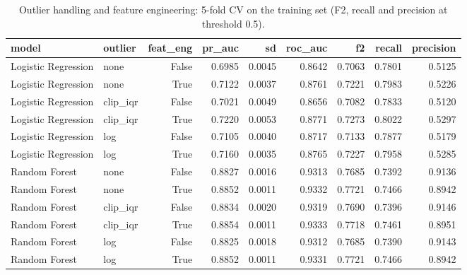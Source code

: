 \begin{table}[H]
\centering
\scriptsize
\begin{adjustbox}{max width=\linewidth}
\begin{tabular}{llrrrrrrr}
\toprule
model & outlier & feat\_eng & pr\_auc & sd & roc\_auc & f2 & recall & precision \\
\midrule
Logistic Regression & none & False & 0.6985 & 0.0045 & 0.8642 & 0.7063 & 0.7801 & 0.5125 \\
Logistic Regression & none & True & 0.7122 & 0.0037 & 0.8761 & 0.7221 & 0.7983 & 0.5226 \\
Logistic Regression & clip\_iqr & False & 0.7021 & 0.0049 & 0.8656 & 0.7082 & 0.7833 & 0.5120 \\
Logistic Regression & clip\_iqr & True & 0.7220 & 0.0053 & 0.8771 & 0.7273 & 0.8022 & 0.5297 \\
Logistic Regression & log & False & 0.7105 & 0.0040 & 0.8717 & 0.7133 & 0.7877 & 0.5179 \\
Logistic Regression & log & True & 0.7160 & 0.0035 & 0.8765 & 0.7227 & 0.7958 & 0.5285 \\
Random Forest & none & False & 0.8827 & 0.0016 & 0.9313 & 0.7685 & 0.7392 & 0.9136 \\
Random Forest & none & True & 0.8852 & 0.0011 & 0.9332 & 0.7721 & 0.7466 & 0.8942 \\
Random Forest & clip\_iqr & False & 0.8834 & 0.0020 & 0.9319 & 0.7690 & 0.7396 & 0.9146 \\
Random Forest & clip\_iqr & True & 0.8854 & 0.0011 & 0.9333 & 0.7718 & 0.7461 & 0.8951 \\
Random Forest & log & False & 0.8825 & 0.0018 & 0.9312 & 0.7685 & 0.7390 & 0.9143 \\
Random Forest & log & True & 0.8852 & 0.0011 & 0.9331 & 0.7721 & 0.7466 & 0.8942 \\
\bottomrule
\end{tabular}
\end{adjustbox}
\caption{Outlier handling and feature engineering: 5-fold CV on the training set (F2, recall and precision at threshold 0.5).}
\label{tab:suite_outlier_fe}
\end{table}
